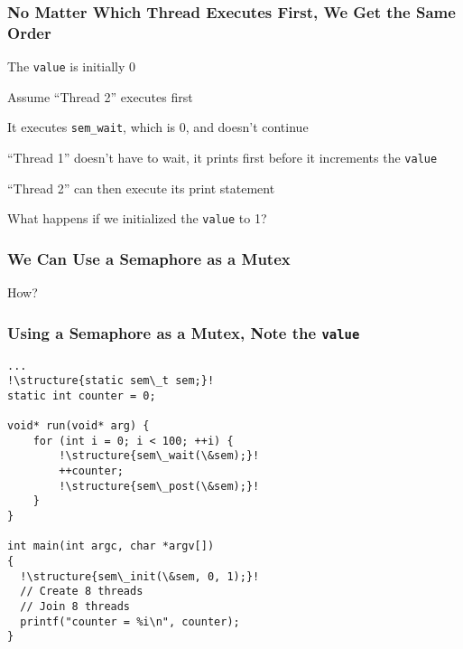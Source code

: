   \begin{frame}
    \frametitle{No Matter Which Thread Executes First, We Get the Same Order}

    The \texttt{value} is initially 0

    \vspace{2em}

    Assume ``Thread 2'' executes first

    \hspace{2em} It executes \texttt{sem\_wait}, which is 0, and doesn't
    continue

    \vspace{2em}

    ``Thread 1'' doesn't have to wait, it prints first before it increments the
    \texttt{value}

    \vspace{2em}

    ``Thread 2'' can then execute its print statement

    \vspace{2em}

    What happens if we initialized the \texttt{value} to 1?
  \end{frame}

  \begin{frame}
    \frametitle{We Can Use a Semaphore as a Mutex}

    How?
  \end{frame}

  \begin{frame}[fragile]
    \frametitle{Using a Semaphore as a Mutex, Note the \texttt{value}}

    \begin{lstlisting}[escapechar=!]
...
!\structure{static sem\_t sem;}!
static int counter = 0;

void* run(void* arg) {
    for (int i = 0; i < 100; ++i) {
        !\structure{sem\_wait(\&sem);}!
        ++counter;
        !\structure{sem\_post(\&sem);}!
    }
}

int main(int argc, char *argv[])
{
  !\structure{sem\_init(\&sem, 0, 1);}!
  // Create 8 threads
  // Join 8 threads
  printf("counter = %i\n", counter);
}
    \end{lstlisting}
  \end{frame}

